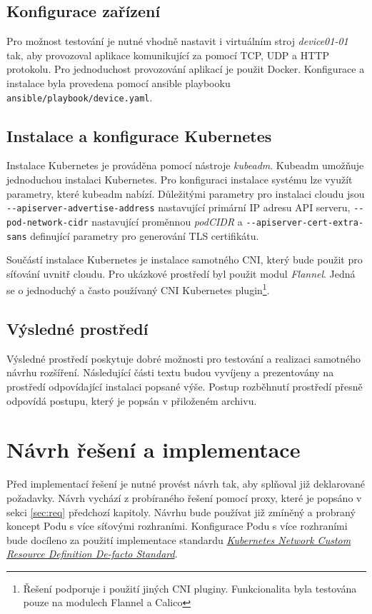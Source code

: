 \subsection{Konfigurace zařízení}
Pro možnost testování je nutné vhodně nastavit i virtuálním stroj \textit{device01-01} tak, aby provozoval aplikace komunikující za pomocí TCP, UDP a HTTP protokolu. Pro jednoduchost provozování aplikací je použit Docker. Konfigurace a instalace byla provedena pomocí ansible playbooku \verb|ansible/playbook/device.yaml|.

\subsection{Instalace a konfigurace Kubernetes}
Instalace Kubernetes je prováděna pomocí nástroje \textit{kubeadm}. Kubeadm umožňuje jednoduchou instalaci Kubernetes. Pro konfiguraci instalace systému lze využít parametry, které kubeadm nabízí. Důležitými parametry pro instalaci cloudu jsou \verb|--apiserver-advertise-address| nastavující primární IP adresu API serveru, \verb|--pod-network-cidr| nastavující proměnnou \textit{podCIDR} a \verb|--apiserver-cert-extra-sans| definující parametry pro generování TLS certifikátu.
 
Součástí instalace Kubernetes je instalace samotného CNI, který bude použit pro síťování uvnitř cloudu. Pro ukázkové prostředí byl použit modul \textit{Flannel}. Jedná se o jednoduchý a často používaný CNI Kubernetes plugin\footnote{Řešení podporuje i použití jiných CNI pluginy. Funkcionalita byla testována pouze na modulech Flannel a Calico}.

\subsection{Výsledné prostředí}
Výsledné prostředí poskytuje dobré možnosti pro testování a realizaci samotného návrhu rozšíření. Následující části textu budou vyvíjeny a prezentovány na prostředí odpovídající instalaci popsané výše. Postup rozběhnutí prostředí přesně odpovídá postupu, který je popsán v přiloženém archivu. 

\section{Návrh řešení a implementace}
Před implementací řešení je nutné provést návrh tak, aby splňoval již deklarované požadavky. Návrh vychází z probíraného řešení pomocí proxy, které je popsáno v sekci \ref{sec:req} předchozí kapitoly. Návrhu bude používat již zmíněný a probraný koncept Podu s více síťovými rozhraními. Konfigurace Podu s více rozhraními bude docíleno za použití implementace standardu \href{https://github.com/k8snetworkplumbingwg/multi-net-spec}{\textit{Kubernetes Network Custom Resource Definition De-facto Standard}}.

